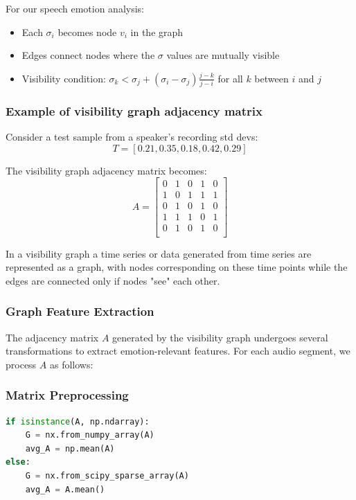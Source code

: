 \documentclass[12pt]{ieeetj}
\begin{document}
For our speech emotion analysis:
\begin{itemize}
    \item Each $\sigma_i$ becomes node $v_i$ in the graph
    \item Edges connect nodes where the $\sigma$ values are mutually visible
    \item Visibility condition: $\sigma_k < \sigma_j + (\sigma_i - \sigma_j)\frac{j-k}{j-i}$ for all $k$ between $i$ and $j$
\end{itemize}

\subsubsection{Example of visibility graph adjacency matrix}
Consider a test sample from a speaker's recording std devs:
\begin{equation}
T = [0.21, 0.35, 0.18, 0.42, 0.29]
\end{equation}

The visibility graph adjacency matrix becomes:
\begin{equation}
A = \begin{bmatrix}
0 & 1 & 0 & 1 & 0 \\
1 & 0 & 1 & 1 & 1 \\
0 & 1 & 0 & 1 & 0 \\
1 & 1 & 1 & 0 & 1 \\
0 & 1 & 0 & 1 & 0 \\
\end{bmatrix}
\end{equation}

In a visibility graph a time series or data generated from time series are represented as a graph,
with nodes corresponding on these time points
while the edges are connected only if nodes "see" each other.

\subsubsection{Graph Feature Extraction}

The adjacency matrix $A$ generated by the visibility graph undergoes several transformations to extract emotion-relevant features. For each audio segment, we process $A$ as follows:

\subsubsection{Matrix Preprocessing}
\begin{lstlisting}[language=Python]
if isinstance(A, np.ndarray):
    G = nx.from_numpy_array(A)
    avg_A = np.mean(A)
else:
    G = nx.from_scipy_sparse_array(A)
    avg_A = A.mean()
\end{lstlisting}
\end{document}
